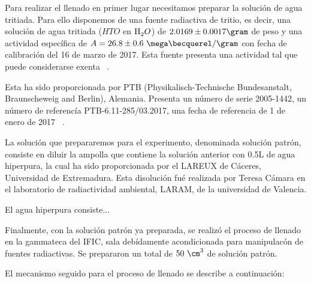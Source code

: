 Para realizar el llenado en primer lugar necesitamos preparar la solución de agua tritiada. Para ello disponemos de una fuente radiactiva de tritio, es decir, una solución de agua tritiada ($HTO$ en $\ce{H_2}O$) de $2.0169 \pm 0.0017\gram$ de peso y una actividad específica de $A=26.8 \pm 0.6~\mega\becquerel/\gram$ con fecha de calibración del 16 de marzo de 2017. Esta fuente presenta una actividad tal que puede considerarse exenta~\cite{IFIC}
.

Esta ha sido proporcionada por PTB (Physikalisch-Technische Bundesanstalt, Braunscheweig and Berlin), Alemania. Presenta un número de serie 2005-1442, un número de referencía PTB-6.11-285/03.2017, una fecha de referencia de 1 de enero de 2017~\cite{IFIC}
.

La solución que prepararemos para el experimento, denominada solución patrón, consiste en diluir la ampolla que contiene la solución anterior con 0.5L de agua hiperpura, la cual ha sido proporcionada por el LAREUX de Cáceres, Universidad de Extremadura. Esta disolución fué realizada por Teresa Cámara en el laboratorio de radiactividad ambiental, LARAM, de la universidad de Valencia.

El agua hiperpura consiste...

Finalmente, con la solución patrón ya preparada, se realizó el proceso de llenado en la gammateca del IFIC, sala debídamente acondicionada para manipulacón de fuentes radiactivas. Se prepararon un total de $50~\cm^3$ de solución patrón.

El mecanismo seguido para el proceso de llenado se describe a continuación:

